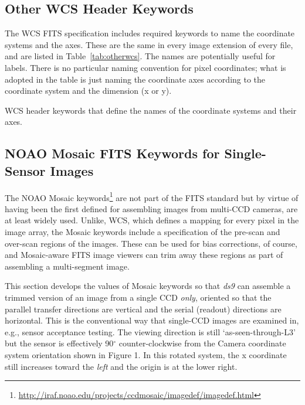 \documentclass{article}[12pt]
\begin{document}
{\subsection{Other WCS Header Keywords \label{sec:coords_ifl}}

The WCS FITS specification includes required keywords to name the coordinate systems and the axes.  These are the same in every image extension of every file, and are listed in Table~\ref{tab:otherwcs}.  The names are potentially useful for labels.  There is no particular naming convention for pixel coordinates; what is adopted in the table is just naming the coordinate axes according to the coordinate system and the dimension (x or y).

\begin{table}
\begin{alltt}

\end{alltt}
\caption{WCS header keywords that define the names of the coordinate systems and their axes.\label{tab:otherwcs}}
\end{table}

\subsection{NOAO Mosaic FITS Keywords for Single-Sensor Images\label{sec:mosaic}}

The NOAO Mosaic keywords\footnote{\url{http://iraf.noao.edu/projects/ccdmosaic/imagedef/imagedef.html}} are not part of the FITS standard but by virtue of having been the first defined for assembling images from multi-CCD cameras, are at least widely used.  Unlike, WCS, which defines a mapping for every pixel in the image array, the Mosaic keywords include a specification of the pre-scan and over-scan regions of the images.  These can be used for bias corrections, of course, and Mosaic-aware FITS image viewers can trim away these regions as part of assembling a multi-segment image.

This section develops the values of Mosaic keywords so that {\it ds9} can assemble a trimmed version of an image from a single CCD {\it only}, oriented so that the parallel transfer directions are vertical and the serial (readout) directions are horizontal.  This is the conventional way that single-CCD images are examined in, e.g., sensor acceptance testing.  The viewing direction is still `as-seen-through-L3' but the sensor is effectively 90$^\circ$ counter-clockwise from the Camera coordinate system orientation shown in Figure 1.  In this rotated system, the x coordinate still increases toward the {\it left} and the origin is at the lower right.

}
\end{document}

